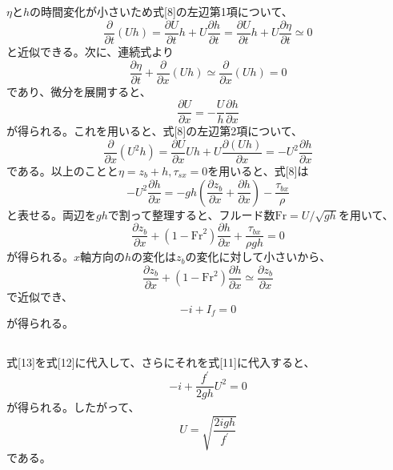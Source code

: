 \documentclass[a4paper]{jsarticle}
\begin{document}
\subsection{}
$\eta$と$h$の時間変化が小さいため式[8]の左辺第1項について、
\begin{equation}
  \frac{\partial}{\partial t} (U h)
  = \frac{\partial U}{\partial t} h + U \frac{\partial h}{\partial t}
  = \frac{\partial U}{\partial t} h + U \frac{\partial \eta}{\partial t}
  \simeq 0
\end{equation}
と近似できる。次に、連続式より
\begin{equation}
  \frac{\partial \eta}{\partial t} + \frac{\partial}{\partial x} (Uh)
  \simeq \frac{\partial}{\partial x} (Uh) = 0
\end{equation}
であり、微分を展開すると、
\begin{equation}
  \frac{\partial U}{\partial x} = -\frac{U}{h} \frac{\partial h}{\partial x}
\end{equation}
が得られる。これを用いると、式[8]の左辺第2項について、
\begin{equation}
  \frac{\partial}{\partial x} (U^2 h)
  = \frac{\partial U}{\partial x} U h + U \frac{\partial (U h)}{\partial x}
  = - U^2 \frac{\partial h}{\partial x}
\end{equation}
である。以上のことと$\eta = z_b + h, \tau_{sx} = 0$を用いると、式[8]は
\begin{equation}
  - U^2 \frac{\partial h}{\partial x}
  = -g h \left(\frac{\partial z_b}{\partial x}
  + \frac{\partial h}{\partial x}\right) - \frac{\tau_{bx}}{\rho}
\end{equation}
と表せる。両辺を$gh$で割って整理すると、フルード数$\mathrm{Fr} = U/\sqrt{gh}$を用いて、
\begin{equation}
  \frac{\partial z_b}{\partial x}
  + (1 - \mathrm{Fr}^2) \frac{\partial h}{\partial x}
  + \frac{\tau_{bx}}{\rho g h} = 0
\end{equation}
が得られる。$x$軸方向の$h$の変化は$z_b$の変化に対して小さいから、
\begin{equation}
  \frac{\partial z_b}{\partial x}
  + (1 - \mathrm{Fr}^2) \frac{\partial h}{\partial x}
  \simeq \frac{\partial z_b}{\partial x}
\end{equation}
で近似でき、
\begin{equation}
  -i + I_f = 0
\end{equation}
が得られる。

\subsection{}
式[13]を式[12]に代入して、さらにそれを式[11]に代入すると、
\begin{equation}
  -i + \frac{f^{\prime}}{2gh} U^2 = 0
\end{equation}
が得られる。したがって、
\begin{equation}
  U = \sqrt{\frac{2 i g h}{f^{\prime}}}
\end{equation}
である。
\end{document}

